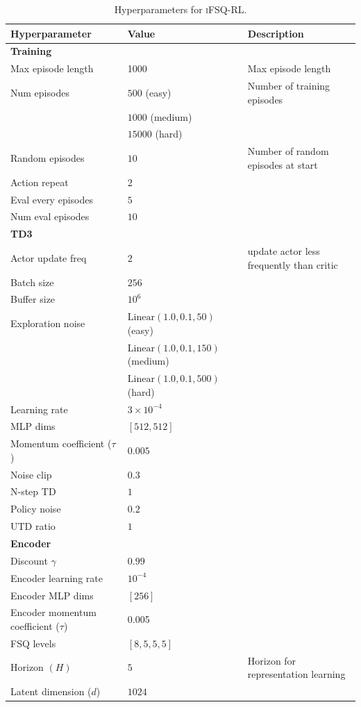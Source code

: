 \documentclass{article}
\theoremstyle{plain}
\theoremstyle{definition}
\theoremstyle{remark}
\newcommand{\our}{\textsc{iFSQ-RL}\xspace}
\begin{document}
\begin{table}[t]
\caption{Hyperparameters for \our.}
\label{tab:hyperparameters}
\vskip 0.15in
\begin{center}
\begin{small}
\begin{sc}
\begin{tabular}{lll}
\toprule
Hyperparameter & Value & Description \\
\midrule
\textbf{Training} & & \\
Max episode length & 1000 &  Max episode length \\
Num episodes & $500$ (easy) & Number of training episodes \\
             & $1000$ (medium) & \\
             & $15000$ (hard) & \\
Random episodes & $10$ & Number of random episodes at start \\
Action repeat & 2 & \\
Eval every episodes & $5$ & \\
Num eval episodes & $10$ & \\
\hline
\textbf{TD3} & & \\
Actor update freq & $2$  & update actor less frequently than critic \\
Batch size & $256$ & \\
Buffer size & $10^{6}$ & \\
Exploration noise & $\mathrm{Linear}(1.0,0.1,50)$ (easy) & \\
                  & $\mathrm{Linear}(1.0,0.1,150)$ (medium) & \\
                  & $\mathrm{Linear}(1.0,0.1,500)$ (hard) & \\
Learning rate & $3 \times 10^{-4}$ & \\
MLP dims & $[512, 512]$ & \\
Momentum coefficient ($\tau$) & $0.005$ & \\
Noise clip & $0.3$ & \\
N-step TD & $1$ & \\
Policy noise & $0.2$ & \\
UTD ratio & $1$ & \\
\hline
\textbf{Encoder} &  & \\
Discount $\gamma$ & $0.99$ & \\
Encoder learning rate & $10^{-4}$ & \\
Encoder MLP dims & $[256]$ & \\
Encoder momentum coefficient ($\tau$) & 0.005 & \\
FSQ levels & $[8, 5, 5, 5]$ & \\
Horizon $(H)$ & $5$ & Horizon for representation learning \\
Latent dimension ($d$) & $1024$ & \\
\end{tabular}
\end{sc}
\end{small}
\end{center}
\vskip -0.1in
\end{table}
\end{document}

